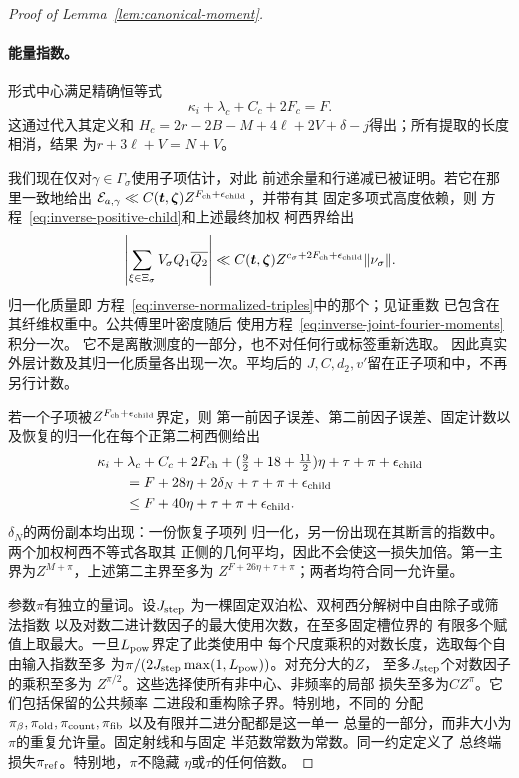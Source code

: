 \documentclass[11pt,a4paper]{article}
\numberwithin{equation}{section}
\numberwithin{figure}{section}
\theoremstyle{definition}
\theoremstyle{remark}
\begin{document}
\begin{proof}[Proof of Lemma~\ref{lem:canonical-moment}]
\paragraph{能量指数。}
形式中心满足精确恒等式
\begin{equation}\label{eq:canonical-prefactor}
 \kappa_i+\lambda_c+C_c+2F_c=F.
\end{equation}
这通过代入其定义和
\(H_c=2r-2B-M+4\ell+2V+\delta-j\)得出；所有提取的长度相消，结果
为\(r+3\ell+V=N+V\)。

我们现在仅对\(\gamma\in\Gamma_\sigma\)使用子项估计，对此
前述余量和行递减已被证明。若它在那里一致地给出
\(\mathcal E_{a,\gamma}\ll C(\boldsymbol t,\boldsymbol\zeta)
Z^{F_{\rm ch}+\epsilon_{\rm child}}\)，并带有其
固定多项式高度依赖，则
方程~\eqref{eq:inverse-positive-child}和上述最终加权
柯西界给出
\[
 \left|\sum_{\xi\in\Xi_\sigma}V_\sigma Q_1\overline{Q_2}\right|
 \ll C(\boldsymbol t,\boldsymbol\zeta)
 Z^{c_\sigma+2F_{\rm ch}+\epsilon_{\rm child}}\|\nu_\sigma\|.
\]
归一化质量即
方程~\eqref{eq:inverse-normalized-triples}中的那个；见证重数
已包含在其纤维权重中。公共傅里叶密度随后
使用方程~\eqref{eq:inverse-joint-fourier-moments}积分一次。
它不是离散测度的一部分，也不对任何行或标签重新选取。
因此真实外层计数及其归一化质量各出现一次。平均后的
\(J,C,d_2,v'\)留在正子项和中，不再另行计数。

若一个子项被\(Z^{F_{\rm ch}+\epsilon_{\rm child}}\)界定，则
第一前因子误差、第二前因子误差、固定计数以及恢复的归一化在每个正第二柯西侧给出
\begin{equation}\label{eq:inverse-step-loss}
 \begin{split}
 &\kappa_i+\lambda_c+C_c+2F_{\rm ch}
      +(\tfrac92+18+\tfrac{11}2)\eta+\tau+\pi+\epsilon_{\rm child}\\
 &\qquad=F+28\eta+2\delta_N+\tau+\pi+\epsilon_{\rm child}\\
 &\qquad\le F+40\eta+\tau+\pi+\epsilon_{\rm child}.
 \end{split}
\end{equation}
\(\delta_N\)的两份副本均出现：一份恢复子项列
归一化，另一份出现在其断言的指数中。两个加权柯西不等式各取其
正侧的几何平均，因此不会使这一损失加倍。第一主界为\(Z^{M+\pi}\)，上述第二主界至多为
\(Z^{F+26\eta+\tau+\pi}\)；两者均符合同一允许量。

参数\(\pi\)有独立的量词。设\(J_{\rm step}\)
为一棵固定双泊松、双柯西分解树中自由除子或筛法指数
以及对数二进计数因子的最大使用次数，在至多固定槽位界的
有限多个赋值上取最大。一旦\(L_{\rm pow}\)界定了此类使用中
每个尺度乘积的对数长度，选取每个自由输入指数至多
为\(\pi/(2J_{\rm step}\max(1,L_{\rm pow}))\)。对充分大的\(Z\)，
至多\(J_{\rm step}\)个对数因子的乘积至多为
\(Z^{\pi/2}\)。这些选择使所有非中心、非频率的局部
损失至多为\(CZ^\pi\)。它们包括保留的公共频率
二进段和重构除子界。特别地，不同的
分配\(\pi_\beta,\pi_{\rm old},\pi_{\rm count},\pi_{\rm fib}\)
以及有限并二进分配都是这一单一
总量的一部分，而非大小为\(\pi\)的重复允许量。固定射线和与固定
半范数常数为常数。同一约定定义了
总终端损失\(\pi_{\rm ref}\)。特别地，\(\pi\)不隐藏
\(\eta\)或\(\tau\)的任何倍数。


\end{proof}
\end{document}
